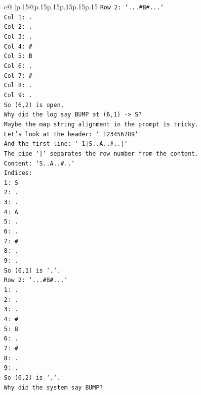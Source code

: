 \documentclass{article}
\begin{document}
{\begin{supertabular}{c@{$\;$}|p{.15\linewidth}@{}p{.15\linewidth}p{.15\linewidth}p{.15\linewidth}p{.15\linewidth}p{.15\linewidth}}
{{{\texttt{Row 2: `...\#B\#...`} \\
\texttt{Col 1: .} \\
\texttt{Col 2: .} \\
\texttt{Col 3: .} \\
\texttt{Col 4: \#} \\
\texttt{Col 5: B} \\
\texttt{Col 6: .} \\
\texttt{Col 7: \#} \\
\texttt{Col 8: .} \\
\texttt{Col 9: .} \\
\texttt{So (6,2) is open.} \\
\texttt{Why did the log say BUMP at (6,1) {-}> S?} \\
\texttt{Maybe the map string alignment in the prompt is tricky.} \\
\texttt{Let's look at the header: ` 123456789`} \\
\texttt{And the first line: ` 1|S..A..\#..|`} \\
\texttt{The pipe `|` separates the row number from the content.} \\
\texttt{Content: `S..A..\#..`} \\
\texttt{Indices:} \\
\texttt{1: S} \\
\texttt{2: .} \\
\texttt{3: .} \\
\texttt{4: A} \\
\texttt{5: .} \\
\texttt{6: .} \\
\texttt{7: \#} \\
\texttt{8: .} \\
\texttt{9: .} \\
\texttt{So (6,1) is `.`.} \\
\texttt{Row 2: `...\#B\#...`} \\
\texttt{1: .} \\
\texttt{2: .} \\
\texttt{3: .} \\
\texttt{4: \#} \\
\texttt{5: B} \\
\texttt{6: .} \\
\texttt{7: \#} \\
\texttt{8: .} \\
\texttt{9: .} \\
\texttt{So (6,2) is `.`.} \\
\texttt{Why did the system say BUMP?} \\
}}}
\end{supertabular}}
\end{document}
